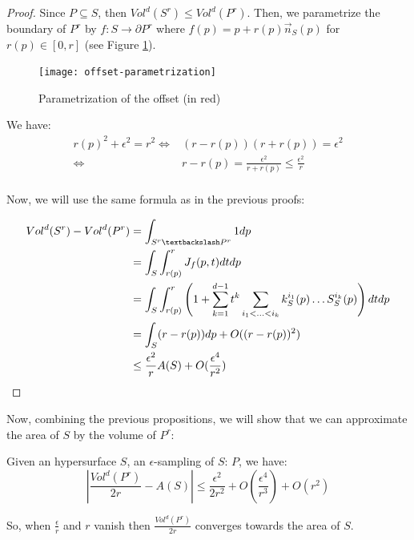 \begin{proof}
    Since $ P \subseteq S $, then $ Vol^d(S^r) \leq Vol^d(P^r) $. Then, we
    parametrize the boundary of $ P^r $ by $ f : S \to \partial P^r $ where $
    f(p) = p + r(p) \vec{n}_S(p) $ for $ r(p) \in [0, r] $ (see Figure
    \ref{fig:offset-parametrization}).

    \begin{figure}[h]
        \centering
        \texttt{[image: offset-parametrization]}
        \caption{Parametrization of the offset (in red)}
        \label{fig:offset-parametrization}
    \end{figure}

    We have:
    \begin{align*}
        r(p)^2 + \epsilon^2 = r^2 \iff& (r - r(p)) (r + r(p)) = \epsilon^2 \\
        \iff& r - r(p) = \frac{\epsilon^2}{r + r(p)} \leq \frac{\epsilon^2}{r} \\
    \end{align*}

    Now, we will use the same formula as in the previous proofs:

    \begin{align*}
        Vol^d(S^r) - Vol^d(P^r) &= \int_{S^r \textbackslash P^r} 1 dp \\
        &= \int_S \int_{r(p)}^r J_f(p, t) dt dp \\
        &= \int_S \int_{r(p)}^r \left( 1 + \sum_{k=1}^{d-1} t^k \sum_{i_1 < \ldots
                < i_k} k^{i_1}_S(p) \ldots S^{i_k}_S(p) \right) dt dp \\
        &= \int_S (r - r(p)) dp + O((r - r(p))^2) \\
        &\leq \frac{\epsilon^2}{r} A(S) + O(\frac{\epsilon^4}{r^2}) \qedhere
    \end{align*}
\end{proof}

Now, combining the previous propositions, we will show that we can approximate
the area of $ S $ by the volume of $ P^r $:

\begin{proposition}
    \label{prop:approx-volume-area}
    Given an hypersurface $ S $, an $\epsilon$-sampling of $ S $: $ P $, we
    have:
    \begin{equation}
        | \frac{Vol^d(P^r)}{2r} - A(S) | \leq \frac{\epsilon^2}{2r^2} +
        O(\frac{\epsilon^4}{r^3}) + O(r^2)
    \end{equation}

    So, when $ \frac{\epsilon}{r} $ and $ r $ vanish then $
    \frac{Vol^d(P^r)}{2r} $ converges towards the area of $ S $.
\end{proposition}

